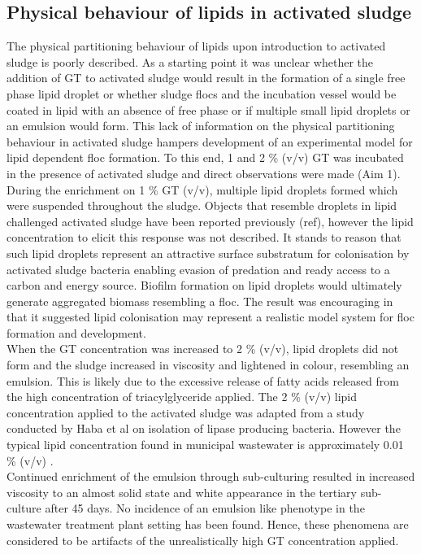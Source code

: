 \documentclass[twoside]{article}
\begin{document}
\subsection{Physical behaviour of lipids in activated sludge}
The physical partitioning behaviour of lipids upon introduction to activated sludge is poorly described. As a starting point it was unclear whether the addition of GT to activated sludge would result in the formation of a single free phase lipid droplet or whether sludge flocs and the incubation vessel would be coated in lipid with an absence of free phase or if multiple small lipid droplets or an emulsion would form. This lack of information on the physical partitioning behaviour in activated sludge hampers development of an experimental model for lipid dependent floc formation. To this end, 1 and 2 \% (v/v) GT was incubated in the presence of activated sludge and direct observations were made (Aim 1). \\

During the enrichment on 1 \% GT (v/v), multiple lipid droplets formed which were suspended throughout the sludge. Objects that resemble droplets in lipid challenged activated sludge have been reported previously (ref), however the lipid concentration to elicit this response was not described. It stands to reason that such lipid droplets represent an attractive surface substratum for colonisation by activated sludge bacteria enabling evasion of predation and ready access to a carbon and energy source. Biofilm formation on lipid droplets would ultimately generate aggregated biomass resembling a floc. The result was encouraging in that it suggested lipid colonisation may represent a realistic model system for floc formation and development. \\

When the GT concentration was increased to 2 \% (v/v), lipid droplets did not form and the sludge increased in viscosity and lightened in colour, resembling an emulsion. This is likely due to the excessive release of fatty acids released from the high concentration of triacylglyceride applied. The 2 \% (v/v) lipid concentration applied to the activated sludge was adapted from a study conducted by Haba et al \cite{haba2000isolation} on isolation of lipase producing bacteria. However the typical lipid concentration found in municipal wastewater is approximately 0.01 \% (v/v) \cite{Forster_92}. \\

Continued enrichment of the emulsion through sub-culturing resulted in increased viscosity to an almost solid state and white appearance in the tertiary sub-culture after 45 days. No incidence of an emulsion like phenotype in the wastewater treatment plant setting has been found. Hence, these phenomena are considered to be artifacts of the unrealistically high GT concentration applied.
\end{document}
